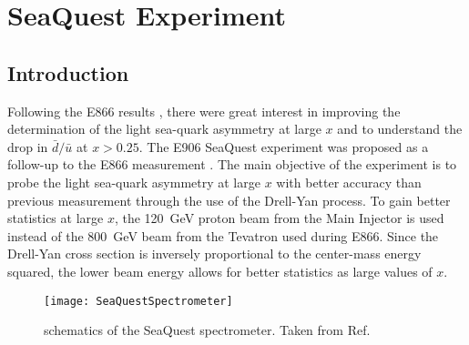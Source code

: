 \documentclass[../main.tex]{subfiles}
\begin{document}
\ifSubfilesClassLoaded{
	\mainmatter
	\setcounter{chapter}{3}
}{}

\chapter{SeaQuest Experiment}
\label{ch:seaquest}

\section{Introduction}
Following the E866 results \cite{towell2001}, there were great interest in improving
the determination of the light sea-quark asymmetry at large $x$ and to understand
the drop in $\bar{d}/\bar{u}$ at $x>0.25$.
The E906 SeaQuest experiment was proposed as a follow-up to the E866 measurement \cite{isenhower2001}.
The main objective of the experiment is to probe the light sea-quark asymmetry at
large $x$ with better accuracy than previous measurement through the use of the Drell-Yan
process. To gain better statistics at large $x$, the \SI{120}{\GeV} proton beam from the Main
Injector is used instead of the \SI{800}{\GeV} beam from the Tevatron used during E866.
Since the Drell-Yan cross section is inversely proportional to the center-mass energy
squared, the lower beam energy allows for better statistics as large values of $x$.

\begin{figure}[htbp!]
	\centering
	\texttt{[image: SeaQuestSpectrometer]}
	\caption{schematics of the SeaQuest spectrometer. Taken from Ref.~\cite{aidala2019}}
	\label{fig:spectrometer}
\end{figure}
\end{document}
